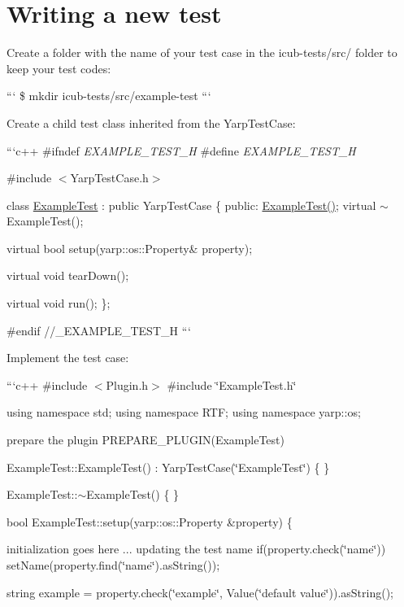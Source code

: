 \hypertarget{writing-and-running_writing-new-tests}{}\section{Writing a new test}\label{writing-and-running_writing-new-tests}
Create a folder with the name of your test case in the {\ttfamily icub-\/tests/src/} folder to keep your test codes\-:

``` \$ mkdir icub-\/tests/src/example-\/test ```

Create a child test class inherited from the {\ttfamily Yarp\-Test\-Case}\-:

```c++ \#ifndef {\itshape E\-X\-A\-M\-P\-L\-E\-\_\-\-T\-E\-S\-T\-\_\-\-H} \#define {\itshape E\-X\-A\-M\-P\-L\-E\-\_\-\-T\-E\-S\-T\-\_\-\-H}

\#include $<$Yarp\-Test\-Case.\-h$>$

class \hyperlink{classExampleTest}{Example\-Test} \-: public Yarp\-Test\-Case \{ public\-: \hyperlink{classExampleTest}{Example\-Test()}; virtual $\sim$\-Example\-Test();

virtual bool setup(yarp\-::os\-::\-Property\& property);

virtual void tear\-Down();

virtual void run(); \};

\#endif //\-\_\-\-E\-X\-A\-M\-P\-L\-E\-\_\-\-T\-E\-S\-T\-\_\-\-H ```

Implement the test case\-:

```c++ \#include $<$Plugin.\-h$>$ \#include \char`\"{}\-Example\-Test.\-h\char`\"{}

using namespace std; using namespace R\-T\-F; using namespace yarp\-::os;

prepare the plugin P\-R\-E\-P\-A\-R\-E\-\_\-\-P\-L\-U\-G\-I\-N(\-Example\-Test)

Example\-Test\-::\-Example\-Test() \-: Yarp\-Test\-Case(\char`\"{}\-Example\-Test\char`\"{}) \{ \}

Example\-Test\-::$\sim$\-Example\-Test() \{ \}

bool Example\-Test\-::setup(yarp\-::os\-::\-Property \&property) \{

initialization goes here ... updating the test name if(property.\-check(\char`\"{}name\char`\"{})) set\-Name(property.\-find(\char`\"{}name\char`\"{}).as\-String());

string example = property.\-check(\char`\"{}example\char`\"{}, Value(\char`\"{}default value\char`\"{})).as\-String();

